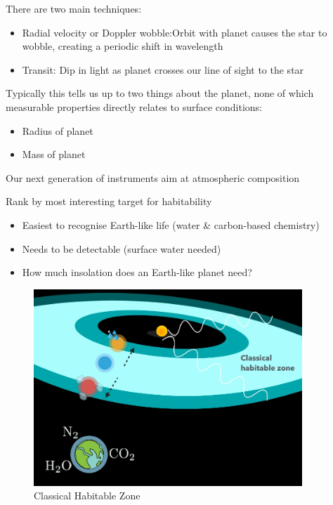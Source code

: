 \documentclass[]{article}
\begin{document}
There are two main techniques:
\begin{itemize}
	\item Radial velocity or Doppler wobble:Orbit with planet causes the
	star to wobble, creating a
	periodic shift in wavelength
	\item Transit: Dip in light as planet crosses
	our line of sight to the star
\end{itemize}

Typically this tells us up to two things about the planet, none of which measurable properties directly relates to surface conditions:
\begin{itemize}
	\item Radius of planet
	\item Mass of planet
\end{itemize}

Our next generation of instruments
aim at atmospheric composition

Rank by most interesting target for habitability

\begin{itemize}
	\item Easiest to recognise Earth-like life 	(water \& carbon-based chemistry)
	\item Needs to be detectable 	(surface water needed)
	\item How much insolation does an 	Earth-like planet need?
\end{itemize}

\begin{figure}[H]
	\caption{Classical Habitable Zone}\label{fig:classical:habitable:zone}
	\includegraphics[width=0.9\textwidth]{ClassicalHabitableZone}
\end{figure}
\end{document}

